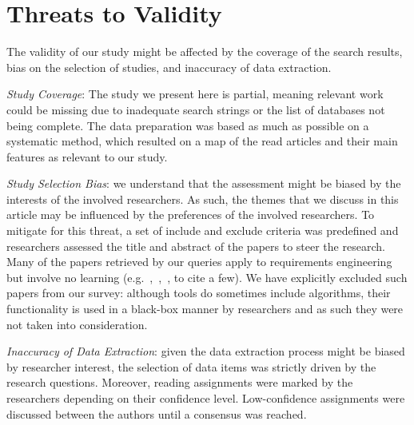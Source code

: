 \section{Threats to Validity}
\label{sec:threats_to_validity}

The validity of our study might be affected by the coverage of the search
results, bias on the selection of studies, and inaccuracy of data extraction.

\emph{Study Coverage}: The study we present here is partial, meaning
relevant work could be missing due to inadequate search strings or
the list of databases not being complete. The data preparation was based as
much as possible on a systematic method, which resulted on a map of the read
articles and their main features as relevant to our study.

\emph{Study Selection Bias}: we understand that the assessment might be biased
by the interests of the involved researchers. As such, the themes that we discuss
in this article may be influenced by the preferences of the involved
researchers. To mitigate for this threat, a set of include and exclude criteria
was predefined and researchers assessed the title and abstract of the papers to
steer the research. Many of the papers retrieved by our queries apply \NLP
to requirements engineering but involve no learning
(e.g.~\cite{Xiao:2012},~\cite{Deeptimahanti:2011},~\cite{ChengHeLiangLi:2010},
to cite a few). We have explicitly excluded such papers from our survey:
although \NLP tools do sometimes include \ML algorithms, their functionality is
used in a black-box manner by \RE researchers and as such they were not taken
into consideration.

\emph{Inaccuracy of Data Extraction}: given the data extraction process might be
biased by researcher interest, the selection of data items was strictly driven
by the research questions. Moreover, reading assignments were marked by the
researchers depending on their confidence level. Low-confidence assignments were
discussed between the authors until a consensus was reached.